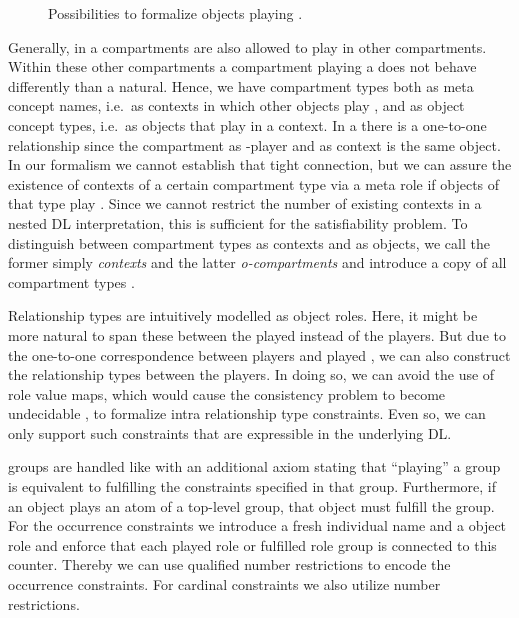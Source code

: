 \begin{figure}
  \centering
  \caption{Possibilities to formalize objects playing \rosiroles.}
  \label{fig:two-ways-to-play-roles}
\end{figure}

Generally, in a \SCROM compartments are also allowed to play \rosiroles in other compartments. Within
these other compartments a compartment playing a \rosirole does not behave differently than a
natural. Hence, we have compartment types both as meta concept names, i.e.\ as contexts in which
other objects play \rosiroles, and as object concept types, i.e.\ as objects that play \rosiroles in a
context. In a \SCROM there is a one-to-one relationship since the compartment as \rosirole-player and as
context is the same object. In our formalism we cannot establish that tight connection, but we can
assure the existence of contexts of a certain compartment type via a meta role \nested if objects of
that type play \rosiroles. Since we cannot restrict the number of existing contexts in a nested DL
interpretation, this is sufficient for the satisfiability problem. To distinguish between
compartment types as contexts and as objects, we call the former simply \emph{contexts} and the latter
\emph{o-compartments} and introduce a copy \CT* of all compartment types \CT.

Relationship types are intuitively modelled as object roles. Here, it might be more natural to span these
between the played \rosiroles instead of the players. But due to the one-to-one correspondence
between players and played \rosiroles, we can also construct the relationship types between the
players. In doing so, we can avoid the use of role value maps, which would cause the consistency
problem to become undecidable \cite{Sch89}, to formalize intra relationship type constraints. Even so, we
can only support such constraints that are expressible in the underlying DL.

\Rosirole groups are handled like \rosiroles with an additional axiom stating that ``playing'' a
\rosirole group is equivalent to fulfilling the constraints specified in that \rosirole
group. Furthermore, if an object plays an atom of a top-level \rosirole group, that object must
fulfill the \rosirole group.
%
For the occurrence constraints we introduce a fresh individual name \occurCounter and a object role
\counts and enforce that each played role or fulfilled role group is connected to this
counter. Thereby we can use qualified number restrictions to encode the occurrence constraints.
%
For cardinal constraints we also utilize number restrictions.

